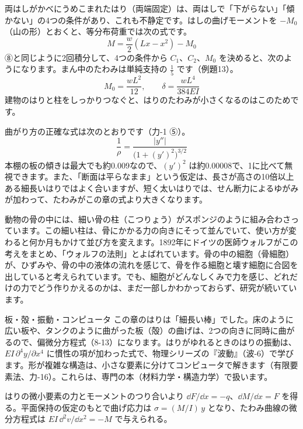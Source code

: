 \begin{motto}[4]
両はしがかべにうめこまれたはり（両端固定）は、両はしで「下がらない」「傾かない」の4つの条件があり、これも不静定です。はしの曲げモーメントを $-M_0$（山の形）とおくと、等分布荷重では次の式です。
\[M=\frac{w}{2}(Lx-x^2)-M_0\]
⑧と同じように2回積分して、4つの条件から $C_1$、$C_2$、$M_0$ を決めると、次のようになります。まん中のたわみは単純支持の $\tfrac{1}{5}$ です（例題13）。
\[M_0=\frac{wL^2}{12},\qquad\delta=\frac{wL^4}{384EI}\]建物のはりと柱をしっかりつなぐと、はりのたわみが小さくなるのはこのためです。
\end{motto}

\begin{seikaku}
曲がり方の正確な式は次のとおりです（力-1 ⑤）。
\[\frac{1}{\rho}=\frac{|y''|}{\bigl(1+(y')^2\bigr)^{3/2}}\]本棚の板の傾きは最大でも約0.009なので、$(y')^2$ は約0.00008で、1に比べて無視できます。また、「断面は平らなまま」という仮定は、長さが高さの10倍以上ある細長いはりではよく合いますが、短く太いはりでは、せん断力によるゆがみが加わって、たわみがこの章の式より大きくなります。
\end{seikaku}

\begin{phmada}[骨は、力に合わせて形を変える]
動物の骨の中には、細い骨の柱（こつりょう）がスポンジのように組み合わさっています。この細い柱は、骨にかかる力の向きにそって並んでいて、使い方が変わると何か月もかけて並び方を変えます。1892年にドイツの医師ウォルフがこの考えをまとめ、「ウォルフの法則」とよばれています。骨の中の細胞（骨細胞）が、ひずみや、骨の中の液体の流れを感じて、骨を作る細胞と壊す細胞に合図を出していると考えられています。でも、細胞がどんなしくみで力を感じ、どれだけの力でどう作りかえるのかは、まだ一部しかわかっておらず、研究が続いています。
\end{phmada}

\begin{phsaki}{板・殻・振動・コンピュータ}
この章のはりは「細長い棒」でした。床のように広い板や、タンクのように曲がった板（殻）の曲げは、2つの向きに同時に曲がるので、偏微分方程式（8-13）になります。はりがゆれるときのはりの振動は、$EI\,\partial^4y/\partial x^4$ に慣性の項が加わった式で、物理シリーズの『波動』（波-6）で学びます。形が複雑な構造は、小さな要素に分けてコンピュータで解きます（有限要素法、力-16）。これらは、専門の本（材料力学・構造力学）で扱います。
\end{phsaki}

\begin{senmonsho}[材料力学の教科書ふうの書き方]
\begin{bkhonbun}
はりの微小要素の力とモーメントのつり合いより $\dd F/\dd x=-q$、$\dd M/\dd x=F$ を得る。平面保持の仮定のもとで曲げ応力は $\sigma=(M/I)\,y$ となり、たわみ曲線の微分方程式は $EI\,\dd^2v/\dd x^2=-M$ で与えられる。
\end{bkhonbun}
\end{senmonsho}

